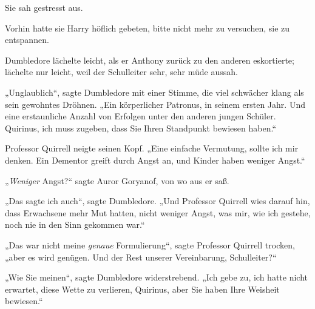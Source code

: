 Sie sah gestresst aus.

Vorhin hatte sie Harry höflich gebeten, bitte nicht mehr zu versuchen, sie zu entspannen.

Dumbledore lächelte leicht, als er Anthony zurück zu den anderen eskortierte; lächelte nur leicht, weil der Schulleiter sehr, sehr müde aussah.

„Unglaublich“, sagte Dumbledore mit einer Stimme, die viel schwächer klang als sein gewohntes Dröhnen. „Ein körperlicher Patronus, in seinem ersten Jahr. Und eine erstaunliche Anzahl von Erfolgen unter den anderen jungen Schüler. Quirinus, ich muss zugeben, dass Sie Ihren Standpunkt bewiesen haben.“

Professor Quirrell neigte seinen Kopf. „Eine einfache Vermutung, sollte ich mir denken. Ein Dementor greift durch Angst an, und Kinder haben weniger Angst.“

„\emph{Weniger} Angst?“ sagte Auror Goryanof, von wo aus er saß.

„Das sagte ich auch“, sagte Dumbledore. „Und Professor Quirrell wies darauf hin, dass Erwachsene mehr Mut hatten, nicht weniger Angst, was mir, wie ich gestehe, noch nie in den Sinn gekommen war.“

„Das war nicht meine \emph{genaue} Formulierung“, sagte Professor Quirrell trocken, „aber es wird genügen. Und der Rest unserer Vereinbarung, Schulleiter?“

„Wie Sie meinen“, sagte Dumbledore widerstrebend. „Ich gebe zu, ich hatte nicht erwartet, diese Wette zu verlieren, Quirinus, aber Sie haben Ihre Weisheit bewiesen.“

